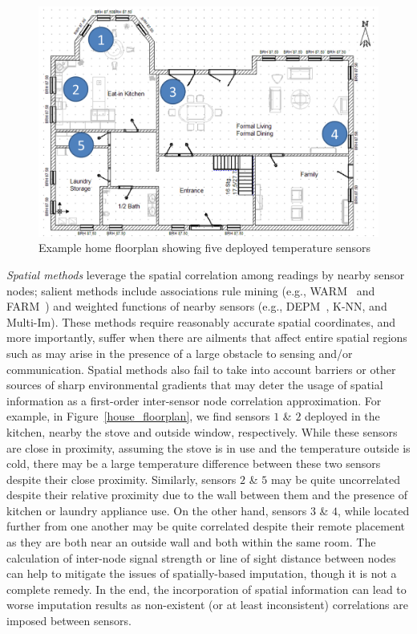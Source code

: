 
\begin{figure}[ht]
\centering
\includegraphics[scale=0.35]{house_floorplan.png}
\caption{Example home floorplan showing five deployed temperature sensors} \label{house_floorplan}
\label{fig:example_home_floorplan}
\end{figure}

{\em Spatial methods} leverage the spatial correlation among readings
by nearby sensor nodes; salient methods include associations rule
mining (e.g., WARM~\cite{le2005estimating} and
FARM~\cite{Gruenwald:FARM}) 
and weighted functions of nearby sensors (e.g., DEPM~\cite{li2008data},
K-NN\cite{pan2010k}, and Multi-Im\cite{yuan2000multiple}).
These methods require reasonably accurate spatial coordinates, and
more importantly, suffer when there are ailments that affect entire
spatial regions such as may arise in the presence of a large obstacle
to sensing and/or communication.
Spatial methods also fail to take into account barriers or other
sources of sharp environmental gradients that may deter the usage of
spatial information as a first-order inter-sensor node correlation
approximation.  For example, in Figure~\ref{house_floorplan}, we find
sensors $1$ \& $2$ deployed in the kitchen, nearby the stove and
outside window, respectively. While these sensors are close in
proximity, assuming the stove is in use and the temperature outside is
cold, there may be a large temperature difference between these two
sensors despite their close proximity.  Similarly, sensors $2$ \& $5$
may be quite uncorrelated despite their relative proximity due to the
wall between them and the presence of kitchen or laundry appliance
use.  On the other hand, sensors $3$ \& $4$, while located further
from one another may be quite correlated despite their remote
placement as they are both near an outside wall and both within the
same room.  The calculation of
inter-node signal strength or line of sight distance between nodes can
help to mitigate the issues of spatially-based imputation, though it is not
a complete remedy.  In the end, the incorporation of spatial
information can lead to worse imputation results as non-existent (or
at least inconsistent) correlations are imposed between sensors.


